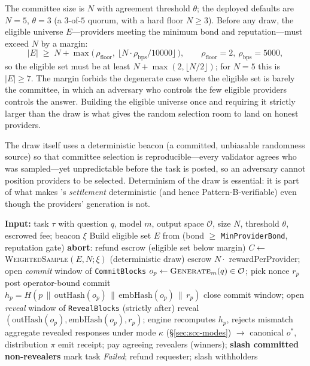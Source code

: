The committee size is $N$ with agreement threshold $\theta$; the deployed defaults are $N{=}5$, $\theta{=}3$ (a $3$-of-$5$ quorum, with a hard floor $N \ge 3$). Before any draw, the eligible universe $E$---providers meeting the minimum bond and reputation---must exceed $N$ by a margin:
\begin{equation}
\label{eq:margin}
|E| \;\ge\; N + \max\!\big(\,\rho_{\mathrm{floor}},\ \lfloor N \cdot \rho_{\mathrm{bps}} / 10000 \rfloor\,\big),
\qquad \rho_{\mathrm{floor}} = 2,\ \rho_{\mathrm{bps}} = 5000,
\end{equation}
so the eligible set must be at least $N + \max(2, \lfloor N/2 \rfloor)$; for $N{=}5$ this is $|E| \ge 7$. The margin forbids the degenerate case where the eligible set is barely the committee, in which an adversary who controls the few eligible providers controls the answer. Building the eligible universe once and requiring it strictly larger than the draw is what gives the random selection room to land on honest providers.

The draw itself uses a deterministic beacon (a committed, unbiasable randomness source) so that committee selection is reproducible---every validator agrees who was sampled---yet unpredictable before the task is posted, so an adversary cannot position providers to be selected. Determinism of the draw is essential: it is part of what makes \SCC{}'s \emph{settlement} deterministic (and hence Pattern-B-verifiable) even though the providers' generation is not.

\begin{algorithm}[h]
\caption{Subsampled Cognitive Consensus: one task.}
\label{alg:scc}
\begin{algorithmic}[1]
\STATE \textbf{Input:} task $\tau$ with question $q$, model $m$, output space $\mathcal{O}$, size $N$, threshold $\theta$, escrowed fee; beacon $\xi$
\STATE Build eligible set $E$ from \RChain{} (bond $\ge$ \texttt{MinProviderBond}, reputation gate)
  \STATE \textbf{abort}: refund escrow (eligible set below margin)
\ENDIF
\STATE $C \gets$ \textsc{WeightedSample}$(E, N; \xi)$ \quad(deterministic draw)
\STATE escrow $N \cdot$ rewardPerProvider; open \emph{commit} window of \texttt{CommitBlocks}
  \STATE $o_p \gets \textsc{Generate}_m(q) \in \mathcal{O}$; pick nonce $r_p$
  \STATE post operator-bound commit $h_p = H(p \,\|\, \mathrm{outHash}(o_p) \,\|\, \mathrm{embHash}(o_p) \,\|\, r_p)$
\ENDFOR
\STATE close commit window; open \emph{reveal} window of \texttt{RevealBlocks} (strictly after)
  \STATE reveal $(\mathrm{outHash}(o_p), \mathrm{embHash}(o_p), r_p)$; engine recomputes $h_p$, rejects mismatch
\ENDFOR
\STATE aggregate revealed responses under mode $\kappa$ (\S\ref{sec:scc-modes}) $\to$ canonical $o^\ast$, distribution $\pi$
  \STATE emit \PoT{} receipt; pay agreeing revealers (winners); \textbf{slash committed non-revealers}
\ELSE
  \STATE mark task \emph{Failed}; refund requester; slash withholders
\ENDIF
\end{algorithmic}
\end{algorithm}

